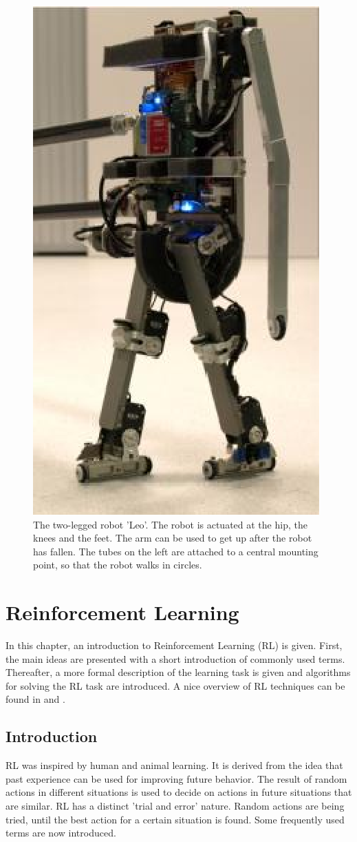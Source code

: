 \documentclass[a4paper,11pt]{mscLiterature}
\begin{document}
\begin{figure}[htbp]
	\centering
		\includegraphics[width=200 pt]{img/leo1}
	\caption{The two-legged robot 'Leo'. The robot is actuated at the hip, the knees and the feet. The arm can be used to get up after the robot has fallen. The tubes on the left are attached to a central mounting point, so that the robot walks in circles.}
	\label{fig:Leo}
\end{figure}



    \cleardoublepage
%

    \chapter{Reinforcement Learning}\label{chap:RL}

    In this chapter, an introduction to Reinforcement Learning (RL) is given. First, the main ideas are presented with a short introduction of commonly used terms. Thereafter, a more formal description of the learning task is given and algorithms for solving the RL task are introduced. A nice overview of RL techniques can be found in \cite{SuttonBarto:98} and \cite{Kaelbling:96}.

        \section{Introduction}\label{sec:RLintroduction}
RL was inspired by human and animal learning. It is derived from the idea that past experience can be used for improving future behavior. The result of random actions in different situations is used to decide on actions in future situations that are similar. RL has a distinct 'trial and error' nature. Random actions are being tried, until the best action for a certain situation is found. Some frequently used terms are now introduced.
\end{document}
